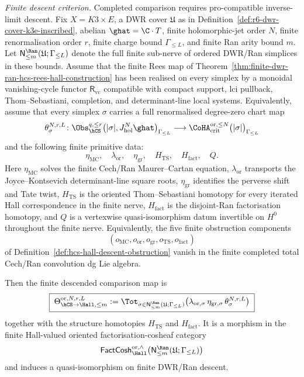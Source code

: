 \begin{theorem}
\label{thm:r6-k3e-local-chart-qiso-inscribed}
\label{thm:finite-dwr-ran-oriented-hcs-hall-comparison}
\noindent\emph{Finite descent criterion.} Completed comparison requires
pro-compatible inverse-limit descent.
Fix $X=K3\times E$, a DWR cover $\mathfrak U$ as in
Definition~\ref{def:r6-dwr-cover-k3e-inscribed}, abelian
$\ghat=\C\cdot T$, finite holomorphic-jet order $N$, finite
renormalisation order $r$, finite charge bound $\Gamma_{\leq L}$, and
finite Ran arity bound $m$. Let
$\mathsf N_{\leq m}^{\Ran}(\mathfrak U;\Gamma_{\leq L})$ denote the
full finite sub-nerve of ordered DWR/Ran simplices in these bounds.
Assume that the finite Rees map of
Theorem~\ref{thm:finite-dwr-ran-hcs-rees-hall-construction} has been
realised on every simplex by a monoidal vanishing-cycle functor
$\mathsf R_{\mathrm{vc}}$ compatible with compact support, lci pullback,
Thom--Sebastiani, completion, and determinant-line local systems.
Equivalently, assume that every simplex $\sigma$ carries a full
renormalised
degree-zero chart map
\[
 \theta^{N,r,L}_{\sigma}\colon
 \Obs_{\hCS}^{q,\leq r}
 \bigl(|\sigma|,J^N_{\mathrm{hol}}\ghat\bigr)_{\Gamma_{\leq L}}
 \longrightarrow
 \CoHA_{\mathrm{crit}}^{\mathrm{or},\leq N}
 \bigl(|\sigma|\bigr)_{\Gamma_{\leq L}}
\]
and the following finite primitive data:
\[
 \eta_{\mathrm{MC}},\quad
 \lambda_{\mathrm{or}},\quad
 \eta_{\mathrm{gr}},\quad
 H_{\mathrm{TS}},\quad
 H_{\mathrm{fact}},\quad Q .
\]
Here $\eta_{\mathrm{MC}}$ solves the finite Cech/Ran Maurer--Cartan
equation, $\lambda_{\mathrm{or}}$ transports the
Joyce--Kontsevich determinant-line square roots, $\eta_{\mathrm{gr}}$
identifies the perverse shift and Tate twist, $H_{\mathrm{TS}}$ is the
oriented Thom--Sebastiani homotopy for every iterated Hall
correspondence in the finite nerve, $H_{\mathrm{fact}}$ is the
disjoint-Ran factorisation homotopy, and $Q$ is a vertexwise
quasi-isomorphism datum invertible on $H^0$ throughout the finite
nerve. Equivalently, the five finite obstruction components
\[
 (o_{\mathrm{MC}},o_{\mathrm{or}},o_{\mathrm{gr}},
 o_{\mathrm{TS}},o_{\mathrm{fact}})
\]
of Definition~\ref{def:hcs-hall-descent-obstruction} vanish in the
finite completed total Cech/Ran convolution dg Lie algebra.

Then the finite descended comparison map is
\[
\boxed{\;
 \Theta_{\hCS\to\Hall,\leq m}^{\mathrm{or},N,r,L}
 :=
 \Tot_{\sigma\in\mathsf N_{\leq m}^{\Ran}(\mathfrak U;\Gamma_{\leq L})}
 \bigl(
 \lambda_{\mathrm{or},\sigma}\,
 \eta_{\mathrm{gr},\sigma}\,
 \theta^{N,r,L}_{\sigma}
 \bigr)
 \;}
\]
together with the structure homotopies $H_{\mathrm{TS}}$ and
$H_{\mathrm{fact}}$. It is a morphism in the finite Hall-valued
oriented factorisation-cosheaf category
\[
 \mathsf{FactCosh}_{\Hall}^{\mathrm{or},\wedge}
 \bigl(\mathsf N_{\leq m}^{\Ran}(\mathfrak U;\Gamma_{\leq L})\bigr)
\]
and induces a quasi-isomorphism on finite DWR/Ran descent.


\end{theorem}
